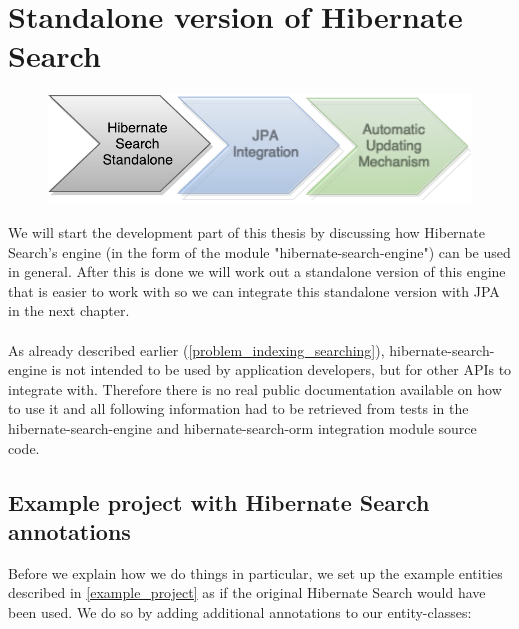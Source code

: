 ~
\pagebreak

\section{Standalone version of Hibernate Search}

\begin{figure}[ht]
	\centering
	\includegraphics[scale=0.75]{images/timeline_genericjpa_first.pdf}
	\label{project_timeline_first}
\end{figure}
\noindent
We will start the development part of this thesis by discussing how Hibernate Search's engine (in the form of the module "hibernate-search-engine") can be used in general. After this is done we will work out a standalone version of this engine that is easier to work with so we can integrate this standalone version with JPA in the next chapter.
\\\\
As already described earlier (\ref{problem_indexing_searching}), hibernate-search-engine is not intended to be used by application developers, but for other APIs to integrate with. Therefore there is no real public documentation available on how to use it and all following information had to be retrieved from tests in the hibernate-search-engine and hibernate-search-orm integration module source code.

\pagebreak

\subsection{Example project with Hibernate Search annotations} \label{setting_up_example_project}

Before we explain how we do things in particular, we set up the example entities described in \ref{example_project} as if the original Hibernate Search would have been used. We do so by adding additional annotations to our entity-classes:

